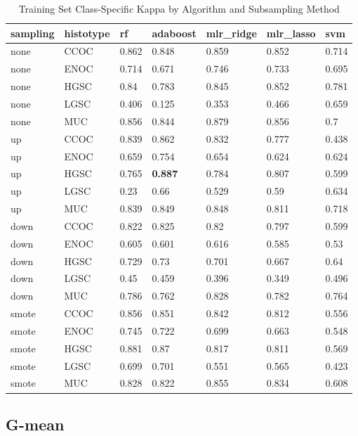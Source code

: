 \documentclass[
]{report}
\begin{document}
\begin{table}

\caption{\label{tab:train-kappa-class-table}Training Set Class-Specific Kappa by Algorithm and Subsampling Method}
\centering
\begin{tabular}[t]{l|l|l|l|l|l|l}
\hline
sampling & histotype & rf & adaboost & mlr\_ridge & mlr\_lasso & svm\\
\hline
none & CCOC & 0.862 & 0.848 & 0.859 & 0.852 & 0.714\\
\hline
none & ENOC & 0.714 & 0.671 & 0.746 & 0.733 & 0.695\\
\hline
none & HGSC & 0.84 & 0.783 & 0.845 & 0.852 & 0.781\\
\hline
none & LGSC & 0.406 & 0.125 & 0.353 & 0.466 & 0.659\\
\hline
none & MUC & 0.856 & 0.844 & 0.879 & 0.856 & 0.7\\
\hline
up & CCOC & 0.839 & 0.862 & 0.832 & 0.777 & 0.438\\
\hline
up & ENOC & 0.659 & 0.754 & 0.654 & 0.624 & 0.624\\
\hline
up & HGSC & 0.765 & \textbf{0.887} & 0.784 & 0.807 & 0.599\\
\hline
up & LGSC & 0.23 & 0.66 & 0.529 & 0.59 & 0.634\\
\hline
up & MUC & 0.839 & 0.849 & 0.848 & 0.811 & 0.718\\
\hline
down & CCOC & 0.822 & 0.825 & 0.82 & 0.797 & 0.599\\
\hline
down & ENOC & 0.605 & 0.601 & 0.616 & 0.585 & 0.53\\
\hline
down & HGSC & 0.729 & 0.73 & 0.701 & 0.667 & 0.64\\
\hline
down & LGSC & 0.45 & 0.459 & 0.396 & 0.349 & 0.496\\
\hline
down & MUC & 0.786 & 0.762 & 0.828 & 0.782 & 0.764\\
\hline
smote & CCOC & 0.856 & 0.851 & 0.842 & 0.812 & 0.556\\
\hline
smote & ENOC & 0.745 & 0.722 & 0.699 & 0.663 & 0.548\\
\hline
smote & HGSC & 0.881 & 0.87 & 0.817 & 0.811 & 0.569\\
\hline
smote & LGSC & 0.699 & 0.701 & 0.551 & 0.565 & 0.423\\
\hline
smote & MUC & 0.828 & 0.822 & 0.855 & 0.834 & 0.608\\
\hline
\end{tabular}
\end{table}

\hypertarget{g-mean}{%
\subsection{G-mean}\label{g-mean}}
\end{document}
